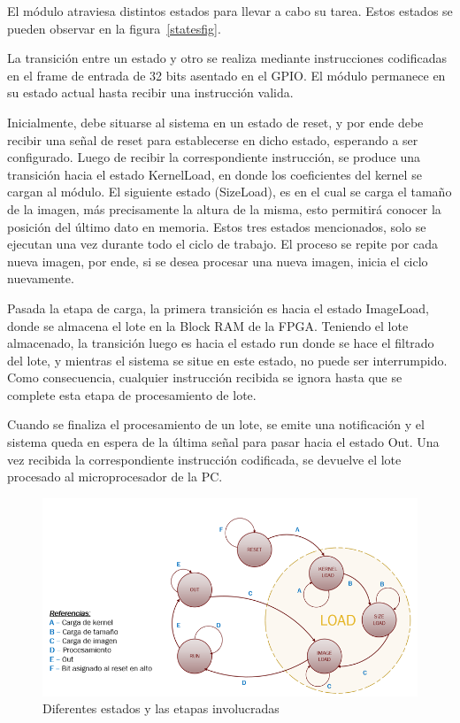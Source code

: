 El módulo atraviesa distintos estados para llevar a cabo su tarea. Estos estados
se pueden observar en la figura~\ref{statesfig}.

La transición entre un estado y
otro se realiza mediante instrucciones codificadas en el frame de entrada de 32
bits asentado en el GPIO. El módulo permanece en su estado actual hasta recibir
una instrucción valida.

Inicialmente, debe situarse al sistema en un estado de reset, y por ende debe
recibir una señal de reset para establecerse en dicho estado, esperando a ser
configurado.
Luego de recibir la correspondiente instrucción, se produce una transición hacia el estado KernelLoad, en donde los coeficientes del kernel se cargan al módulo.
El siguiente estado (SizeLoad), es en el cual se carga el tamaño de la imagen,
más precisamente la altura de la misma, esto permitirá conocer la posición del
último dato en memoria.
Estos tres estados mencionados, solo se ejecutan una vez durante todo el ciclo
de trabajo. El proceso se repite por cada nueva imagen, por ende, si se desea
procesar una nueva imagen, inicia el ciclo nuevamente.

Pasada la etapa de carga, la primera transición es hacia el
estado ImageLoad, donde se almacena el lote en la Block RAM de la FPGA.
Teniendo el lote almacenado, la transición luego es hacia el estado run donde se
hace el filtrado del lote, y mientras el sistema se situe en este estado, no
puede ser interrumpido.
Como consecuencia, cualquier instrucción recibida se ignora hasta que se
complete esta etapa de procesamiento de lote.

Cuando se finaliza el procesamiento de un lote, se emite una notificación y el sistema
queda en espera de la última señal para pasar hacia el estado Out. Una vez recibida la
correspondiente instrucción codificada, se devuelve el lote procesado al
microprocesador de la PC.

\begin{figure}
\centering
\includegraphics[scale=0.7]{states_2.png}
\caption{Diferentes estados y las etapas involucradas }
\label{statesfig2}
\end{figure}

